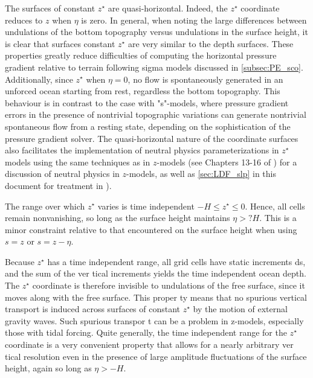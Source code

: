 \documentclass[../main/NEMO_manual]{subfiles}
\begin{document}
The surfaces of constant $z^\star$ are quasi-horizontal.
Indeed, the $z^\star$ coordinate reduces to $z$ when $\eta$ is zero.
In general, when noting the large differences between
undulations of the bottom topography versus undulations in the surface height,
it is clear that surfaces constant $z^\star$ are very similar to the depth surfaces.
These properties greatly reduce difficulties of computing the horizontal pressure gradient relative to
terrain following sigma models discussed in \autoref{subsec:PE_sco}.
Additionally, since $z^\star$ when $\eta = 0$,
no flow is spontaneously generated in an unforced ocean starting from rest, regardless the bottom topography.
This behaviour is in contrast to the case with "s"-models, where pressure gradient errors in the presence of
nontrivial topographic variations can generate nontrivial spontaneous flow from a resting state,
depending on the sophistication of the pressure gradient solver.
The quasi-horizontal nature of the coordinate surfaces also facilitates the implementation of
neutral physics parameterizations in $z^\star$ models using the same techniques as in $z$-models
(see Chapters 13-16 of \cite{Griffies_Bk04}) for a discussion of neutral physics in $z$-models,
as well as \autoref{sec:LDF_slp} in this document for treatment in \NEMO).

The range over which $z^\star$ varies is time independent $-H \leq z^\star \leq 0$.
Hence, all cells remain nonvanishing, so long as the surface height maintains $\eta > ?H$.
This is a minor constraint relative to that encountered on the surface height when using $s = z$ or $s = z - \eta$. 

Because $z^\star$ has a time independent range, all grid cells have static increments ds,
and the sum of the ver tical increments yields the time independent ocean depth. %
The $z^\star$ coordinate is therefore invisible to undulations of the free surface,
since it moves along with the free surface.
This proper ty means that no spurious vertical transport is induced across surfaces of constant $z^\star$ by
the motion of external gravity waves.
Such spurious transpor t can be a problem in z-models, especially those with tidal forcing.
Quite generally, the time independent range for the $z^\star$ coordinate is a very convenient property that
allows for a nearly arbitrary ver tical resolution even in the presence of large amplitude fluctuations of
the surface height, again so long as $\eta > -H$.

\end{document}

